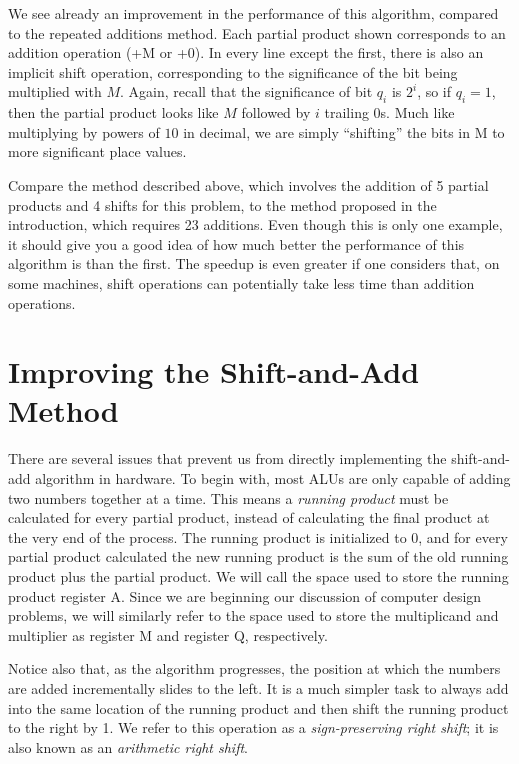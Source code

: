 \documentclass{article}
\begin{document}
We see already an improvement in the performance of this algorithm, compared to the repeated additions method.
Each partial product shown corresponds to an addition operation (+M or +0).
In every line except the first, there is also an implicit shift operation, corresponding to the significance of the bit being multiplied with $M$.
Again, recall that the significance of bit $q_i$ is $2^i$, so if $q_i = 1$, then the partial product looks like $M$ followed by $i$ trailing 0s.
Much like multiplying by powers of $10$ in decimal, we are simply ``shifting'' the bits in M to more significant place values.

Compare the method described above, which involves the addition of 5 partial products and 4 shifts for this problem, to the method proposed in the introduction, which requires 23 additions.
Even though this is only one example, it should give you a good idea of how much better the performance of this algorithm is than the first.
The speedup is even greater if one considers that, on some machines, shift operations can potentially take less time than addition operations.

\section{Improving the Shift-and-Add Method}
There are several issues that prevent us from directly implementing the shift-and-add algorithm in hardware.
To begin with, most ALUs are only capable of adding two numbers together at a time.
This means a \emph{running product} must be calculated for every partial product, instead of calculating the final product at the very end of the process.
The running product is initialized to 0, and for every partial product calculated the new running product is the sum of the old running product plus the partial product.
We will call the space used to store the running product register A.
Since we are beginning our discussion of computer design problems, we will similarly refer to the space used to store the multiplicand and multiplier as register M and register Q, respectively.

Notice also that, as the algorithm progresses, the position at which the numbers are added incrementally slides to the left.
It is a much simpler task to always add into the same location of the running product and then shift the running product to the right by 1.
We refer to this operation as a \emph{sign-preserving right shift}; it is also known as an \emph{arithmetic right shift}.
\end{document}
